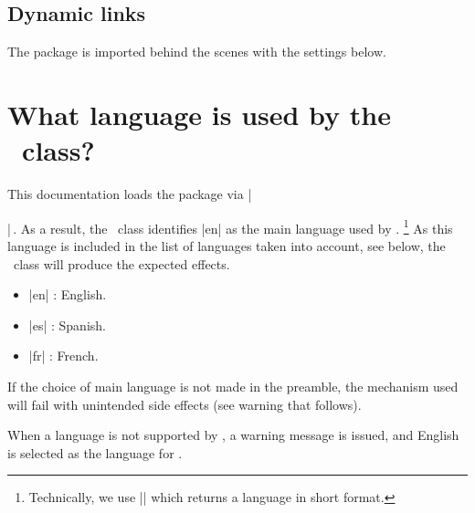 \subsection{Dynamic links}

The  package is imported behind the scenes with the settings below.


\begin{tdoclatex}[code]
\newcommand{\tdoclinkcolor}{NavyBlue!85!white}

\hypersetup{
  colorlinks,
  citecolor = \tdoclinkcolor,
  filecolor = \tdoclinkcolor,
  linkcolor = \tdoclinkcolor,
  urlcolor  = \tdoclinkcolor
}
\end{tdoclatex}


\section{What language is used by the \thisproj\ class?}

This documentation loads the  package via \tdocinlatex|\usepackage[english]{babel}|\,.
As a result, the \thisproj\ class identifies \tdocinlatex|en| as the main language used by .%
\footnote{
    Technically, we use \tdocinlatex|| which returns a language in short format.
}
As this language is included in the list of languages taken into account, see below, the \thisproj\ class will produce the expected effects.

\begin{multicols}{3}
    \begin{itemize}
        \item \tdocinlatex|en| : English.
        \item \tdocinlatex|es| : Spanish.
        \item \tdocinlatex|fr| : French.
    \end{itemize}
\end{multicols}
                    


\begin{tdoccaut}
    If the choice of main language is not made in the preamble, the mechanism used will fail with unintended side effects (see warning that follows).
\end{tdoccaut}


\begin{tdocwarn}
    When a language is not supported by \thisproj, a warning message is issued, and English is selected as the language for \thisproj.
\end{tdocwarn}


